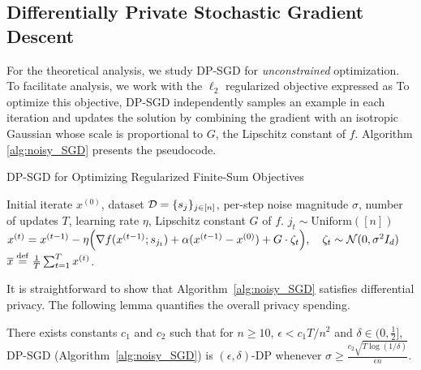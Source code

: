 \subsection{Differentially Private Stochastic Gradient Descent}
For the theoretical analysis, we study DP-SGD for \emph{unconstrained} optimization. 
To facilitate analysis, we work with the $\ell_{2}$ regularized objective expressed as 
To optimize this objective, DP-SGD independently samples an example in each iteration and updates the solution by combining the gradient with an isotropic Gaussian whose scale is proportional to $G$, the Lipschitz constant of $f$. 
Algorithm \ref{alg:noisy_SGD} presents the pseudocode.
\begin{algorithm}
\caption{DP-SGD for Optimizing Regularized Finite-Sum Objectives}
\label{alg:noisy_SGD}
\begin{algorithmic}[1]
 Initial iterate $x^{(0)}$, dataset $\mathcal D = \{s_j\}_{j \in [n]}$, per-step noise magnitude $\sigma$, number of updates $T$, learning rate $\eta$, Lipschitz constant $G$ of $f$.
    \State $j_t \sim \text{Uniform}([n])$
    \State $x^{(t)} = x^{(t-1)} - \eta\Big(\nabla f(x^{(t-1)};s_{j_t}) + \alpha(x^{(t-1)}-x^{(0)})+ G \cdot \zeta_t \Big), \quad \zeta_t \sim \mathcal N(0,\sigma^{2}I_d)$
\EndFor
\State \Return $\overline{x}\stackrel{{\mathrm{def}}}{=}\frac{1}{T}\sum_{t=1}^{T}x^{(t)}$.
\end{algorithmic}
\end{algorithm}


It is straightforward to show that Algorithm~\ref{alg:noisy_SGD} satisfies differential privacy. 
The following lemma quantifies the overall privacy spending.
\begin{lemm}
\label{lm:privacy_guarantee}
There exists constants $c_1$ and $c_2$ such that for $n\geq10$, $\epsilon< c_1 T/n^2$ and $\delta \in (0, \frac{1}{2}]$, DP-SGD (Algorithm~\ref{alg:noisy_SGD}) is $(\epsilon,\delta)$-DP whenever $\sigma \ge \frac{c_2 \sqrt{T\log(1/\delta)}}{\epsilon n}$.
\end{lemm}

